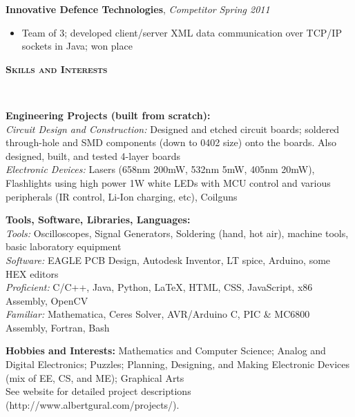 \documentclass{article}
\newenvironment{changemargin}[2]{%
  \begin{list}{}{%
    \setlength{\topsep}{0pt}%
    \setlength{\leftmargin}{#1}%
    \setlength{\rightmargin}{#2}%
    \setlength{\listparindent}{\parindent}%
    \setlength{\itemindent}{\parindent}%
    \setlength{\parsep}{\parskip}%
  }%
  \item[]}{\end{list}
}
\newcommand{\lineover}{
	\begin{changemargin}{-0.05in}{-0.05in}
		\vspace*{-8pt}
		\hrulefill \\
		\vspace*{-2pt}
	\end{changemargin}
}
\newcommand{\header}[1]{
	\begin{changemargin}{-0.5in}{-0.5in}
		{\large \textbf{\scshape{#1}}}\\
  	\lineover
	\end{changemargin}
}
\newenvironment{body} {
	\vspace*{-16pt}
	\begin{changemargin}{-0.25in}{-0.5in}
  }	
	{\end{changemargin}
}
\begin{document}
\begin{body}
	\medskip
	
	\textbf{Innovative Defence Technologies}, \emph{Competitor} \hfill \emph{Spring 2011}\\
	\vspace*{-4pt}
	\begin{itemize}
		\item Team of 3; developed client/server XML data communication over TCP/IP sockets in Java; won  place
	\end{itemize}
\end{body}

\smallskip


\header{Skills and Interests}

\begin{body}
	\vspace{14pt}
	\textbf{Engineering Projects (built from scratch):} \\
	\textit{Circuit Design and Construction:} Designed and etched circuit boards; soldered through-hole and SMD components (down to 0402 size) onto the boards.  Also designed, built, and tested 4-layer boards \\
	\textit{Electronic Devices:} Lasers (658nm 200mW, 532nm 5mW, 405nm 20mW), Flashlights using high power 1W white LEDs with MCU control and various peripherals (IR control, Li-Ion charging, etc), Coilguns \\
	
	\medskip

	\textbf{Tools, Software, Libraries, Languages:} \\
	\textit{Tools:} Oscilloscopes, Signal Generators, Soldering (hand, hot air), machine tools, basic laboratory equipment \\
	\textit{Software:} EAGLE PCB Design, Autodesk Inventor, LT spice, Arduino, some HEX editors \\
	\textit{Proficient:} C/C++, Java, Python, \LaTeX, HTML, CSS, JavaScript, x86 Assembly, OpenCV \\ 
	\textit{Familiar:} Mathematica, Ceres Solver, AVR/Arduino C, PIC \& MC6800 Assembly, Fortran, Bash \\

	\medskip

	\textbf{Hobbies and Interests:} Mathematics and Computer Science; Analog and Digital Electronics; Puzzles; Planning, Designing, and Making Electronic Devices (mix of EE, CS, and ME); Graphical Arts \\ See website for detailed project descriptions (http://www.albertgural.com/projects/). \\
\end{body}

\smallskip
\end{document}
